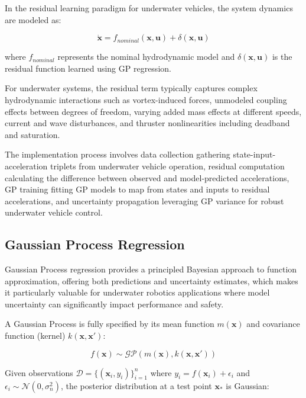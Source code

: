 In the residual learning paradigm for underwater vehicles, the system dynamics are modeled as:

\begin{equation}
\dot{\mathbf{x}} = f_{nominal}(\mathbf{x}, \mathbf{u}) + \delta(\mathbf{x}, \mathbf{u})
\end{equation}

where $f_{nominal}$ represents the nominal hydrodynamic model and $\delta(\mathbf{x}, \mathbf{u})$ is the residual function learned using GP regression.

For underwater systems, the residual term typically captures complex hydrodynamic interactions such as vortex-induced forces, unmodeled coupling effects between degrees of freedom, varying added mass effects at different speeds, current and wave disturbances, and thruster nonlinearities including deadband and saturation.

The implementation process involves data collection gathering state-input-acceleration triplets from underwater vehicle operation, residual computation calculating the difference between observed and model-predicted accelerations, GP training fitting GP models to map from states and inputs to residual accelerations, and uncertainty propagation leveraging GP variance for robust underwater vehicle control.

\subsection{Gaussian Process Regression}
Gaussian Process regression provides a principled Bayesian approach to function approximation, offering both predictions and uncertainty estimates, which makes it particularly valuable for underwater robotics applications where model uncertainty can significantly impact performance and safety.

A Gaussian Process is fully specified by its mean function $m(\mathbf{x})$ and covariance function (kernel) $k(\mathbf{x}, \mathbf{x}')$:

\begin{equation}
f(\mathbf{x}) \sim \mathcal{GP}(m(\mathbf{x}), k(\mathbf{x}, \mathbf{x}'))
\end{equation}

Given observations $\mathcal{D} = \{(\mathbf{x}_i, y_i)\}_{i=1}^n$ where $y_i = f(\mathbf{x}_i) + \epsilon_i$ and $\epsilon_i \sim \mathcal{N}(0, \sigma_n^2)$, the posterior distribution at a test point $\mathbf{x}_*$ is Gaussian:

